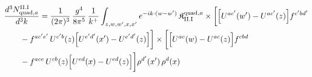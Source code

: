 \begingroup\small
\begin{align}\label{eq:H-II.I-2a}
&\frac{d^{3}N^{\rm II.I}_{{\rm quad},a}}{d^{3}k}=\frac{1}{(2\pi)^{3}}\, \frac{g^{4}}{8\pi^{5}}\, \frac{1}{k^{+}} \int_{z,w,w',x,x'}e^{-ik\cdot(w-w')}\, \mathfrak{K}^{{\rm quad},a}_{\rm II.I} \times\bigg[\Big[U^{ac'}(w')-U^{ac'}(z)\Big]f^{c'bd'}\notag\\
&\quad\quad -f^{ac'e'}\, U^{c'b}(z)\Big[U^{e'd'}(x')-U^{e'd'}(z)\Big]\bigg] \times\bigg[\Big[U^{ac}(w)-U^{ac}(z)\Big]f^{cbd}\notag\\
&\quad\quad -f^{ace}\, U^{cb}(z)\Big[U^{ed}(x)-U^{ed}(z)\Big]\bigg]\rho^{d'}(x')\, \rho^{d}(x)
\end{align}
\endgroup
